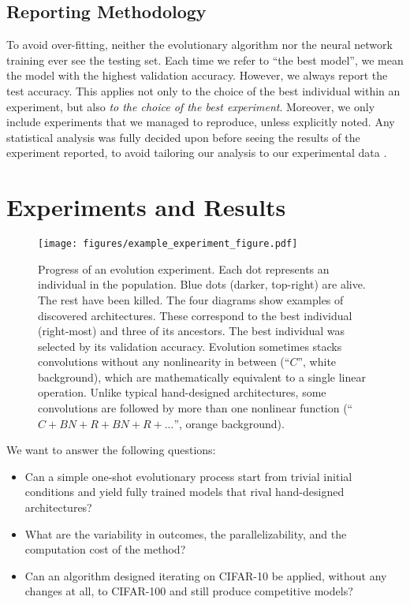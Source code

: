 \documentclass{article}
\renewcommand{\cite}[1]{\citep{#1}}
\begin{document}
\subsection{Reporting Methodology}
\label{reporting_section}

To avoid over-fitting, neither the evolutionary algorithm nor the neural network training ever see the testing set. Each time we refer to ``the best model'', we mean the model with the highest validation accuracy. However, we always report the test accuracy. This applies not only to the choice of the best individual within an experiment, but also {\em to the choice of the best experiment}. Moreover, we only include experiments that we managed to reproduce, unless explicitly noted. Any statistical analysis was fully decided upon before seeing the results of the experiment reported, to avoid tailoring our analysis to our experimental data \cite{simmons2011false}.


\section{Experiments and Results}
\label{results_section}

\begin{figure*}
    \vskip 0.2in
    \begin{centering}
        \centerline{\texttt{[image: figures/example\_experiment\_figure.pdf]}}
        \caption{Progress of an evolution experiment. Each dot represents an individual in the population. Blue dots (darker, top-right) are alive. The rest have been killed. The four diagrams show examples of discovered architectures. These correspond to the best individual (right-most) and three of its ancestors. The best individual was selected by its validation accuracy. Evolution sometimes stacks convolutions without any nonlinearity in between (``$C$'', white background), which are mathematically equivalent to a single linear operation. Unlike typical hand-designed architectures, some convolutions are followed by more than one nonlinear function (``$C+BN+R+BN+R+...$'', orange background).}
        \label{example_experiment_figure}
    \end{centering}
    \vskip 0.2in
\end{figure*}

We want to answer the following questions:
\begin{itemize}[noitemsep,topsep=0pt,leftmargin=*]
    \item Can a simple one-shot evolutionary process start from trivial initial conditions and yield fully trained models that rival hand-designed architectures?
    \item What are the variability in outcomes, the parallelizability, and the computation cost of the method?
    \item Can an algorithm designed iterating on CIFAR-10 be applied, without any changes at all, to CIFAR-100 and still produce competitive models?
\end{itemize}
\end{document}
